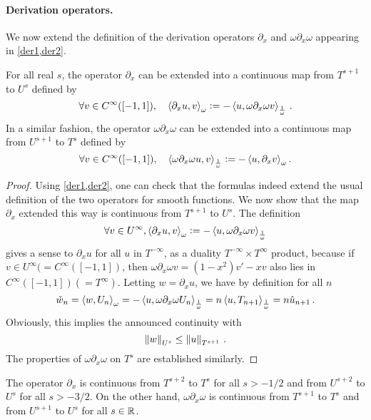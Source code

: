 \documentclass[a4paper]{article}
\begin{document}
\paragraph{Derivation operators.} We now extend the definition of the derivation operators $\partial_x$ and $\omega\partial_x\omega$ appearing in \cref{der1,der2}.

 
\begin{Lem}
	\label{derivations}
	For all real $s$, the operator $\partial_x$ can be extended into a continuous map from $T^{s+1}$ to $U^{s}$ defined by 
	\[\forall v \in C^{\infty}([-1,1]), \quad \left\langle \partial_x u,v\right\rangle_{\omega} \mathrel{\mathop:}= -\left\langle u,\omega \partial_x \omega v\right\rangle_{\frac{1}{\omega}} \,.\] 
	In a similar fashion, the  operator $\omega \partial_x \omega$ can be extended into a continuous map from $U^{s+1}$ to $T^{s}$ defined by
	\[\forall v \in C^{\infty}([-1,1]), \quad \left\langle \omega \partial_x \omega u,v\right\rangle_\frac{1}{\omega} \mathrel{\mathop:}= -\left\langle u,\partial_x v\right\rangle_\omega.\]
\end{Lem}
\begin{proof}
	Using \cref{der1,der2}, one can check that the formulas indeed extend the usual definition of the two operators for smooth functions. We now show that the map $\partial_x$ extended this way is continuous from $T^{s+1}$ to $U^s$. The definition 
	\[\forall v \in U^{\infty}, \left\langle \partial_x u,v\right\rangle_\omega \mathrel{\mathop:}= -\left\langle u,\omega \partial_x \omega v\right\rangle_\frac{1}{\omega}\]
	gives a sense to $\partial_x u$ for all $u$ in $T^{-\infty}$, as a duality $T^{-\infty} \times T^{\infty}$ product, because if $v \in U^{\infty} (= C^{\infty}([-1,1])$, then $\omega \partial_x \omega v = (1-x^2)v' - xv$ also lies in $C^{\infty}([-1,1]) (= T^\infty)$. Letting $w = \partial_x u$, we have by definition for all $n$
	\[\check{w}_n = \left\langle w,U_n\right\rangle_{\omega} = - \left\langle u,\omega \partial_x \omega U_n\right\rangle_\frac{1}{\omega} = n \left\langle u,T_{n+1}\right\rangle_\frac{1}{\omega} = n\hat{u}_{n+1}\,.\]
	Obviously, this implies the announced continuity with
	\[ \left\|w\right\|_{U^s} \leq \left\|u\right\|_{T^{s+1}}\,.\]
	The properties of $\omega \partial_x \omega$ on $T^s$ are established similarly. 
\end{proof}
\begin{Cor}
	\label{corDxT2T0}
	The operator $\partial_x$ is continuous from $T^{s+2}$ to $T^s$ for all $s > -1/2 $ and from $U^{s+2}$ to $U^s$ for all $s > - 3/2$. On the other hand, $\omega \partial_x \omega$ is continuous from $T^{s+1}$ to $T^s$ and from $U^{s+1}$ to $U^s$ for all $s \in \mathbb{R}$. 
\end{Cor}
\end{document}
